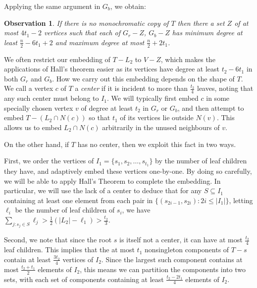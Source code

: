 \documentclass[11pt]{article}
\newtheorem{obs}[theorem]{Observation}
\begin{document}
Applying the same argument in $G_b$, we obtain:  

\begin{obs} If there is no monochromatic copy of $T$ then there a set $Z$ of at most $4 t_1-2$ vertices such that each of $G_r-Z$, $G_b-Z$ has minimum degree at least $\frac{n}{2}-6t_1+2$ and maximum degree at most $\frac{n}{2}+2t_1$.    
\end{obs}
 
We often restrict our embedding of $T-L_2$ to $V-Z$, which makes the applications of Hall's theorem easier as its vertices have degree at least $t_2-6t_1$ in both $G_r$ and $G_b$. How we carry out this embedding depends on the shape of $T$. We call a vertex $c$ of $T$ a \emph{center} if it is incident to more than $\frac{t_2}{4}$ leaves, noting that any such center must belong to $I_1$. We will typically first embed $c$ in some specially chosen vertex $v$ of degree at least $t_2$ in $G_r$ or $G_b$, and then attempt to embed $T-(L_2 \cap N(c))$ so that $t_1$ of its vertices lie outside $N(v)$. This allows us to embed $L_2 \cap N(c)$ arbitrarily in the unused neighbours of $v$.

On the other hand, if $T$ has no center, then we exploit this fact in two ways.

First, we order the vertices of $I_1 = \{s_1, s_2, \hdots, s_{t_1} \}$ by the number of leaf children they have, and adaptively embed these vertices one-by-one.
By doing so carefully, we will be able to apply Hall's Theorem to complete the embedding. 
In particular, we will use the lack of a center to deduce that for any $S \subseteq I_1$ containing at least one element from each pair in $\{(s_{2i-1},s_{2i}) : 2i \le |I_1|\}$, letting $\ell_i$ be the number of leaf children of $s_i$, we have $\sum_{j : s_j \in S} \ell_j > \tfrac12(|L_2|-\ell_1)> \tfrac{t_2}{3}$. 

Second, we note that since the root $s$ is itself not a center, it can have at most $\frac{t_2}{4}$ leaf children. This implies that the at most $t_1$ nonsingleton components of $T-s$ contain at least $\frac{3t_2}{4}$ vertices of $I_2$. Since the largest such component contains at most  $\frac{t_2+t_1}{2}$ elements of $I_2$, this means we can partition the components into two sets, with each set of components containing at least $\frac{t_2-2t_1}{4}$ elements of $I_2$.
\end{document}
